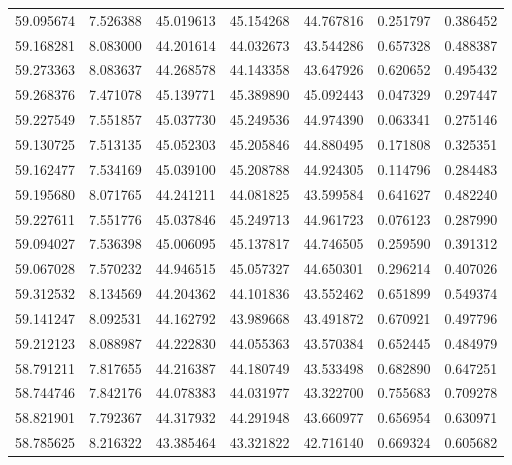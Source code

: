 \begin{tabular}{rrrrrrr}
 59.095674 &   7.526388 &         45.019613 &         45.154268 &         44.767816 &  0.251797 &  0.386452 \\
 59.168281 &   8.083000 &         44.201614 &         44.032673 &         43.544286 &  0.657328 &  0.488387 \\
 59.273363 &   8.083637 &         44.268578 &         44.143358 &         43.647926 &  0.620652 &  0.495432 \\
 59.268376 &   7.471078 &         45.139771 &         45.389890 &         45.092443 &  0.047329 &  0.297447 \\
 59.227549 &   7.551857 &         45.037730 &         45.249536 &         44.974390 &  0.063341 &  0.275146 \\
 59.130725 &   7.513135 &         45.052303 &         45.205846 &         44.880495 &  0.171808 &  0.325351 \\
 59.162477 &   7.534169 &         45.039100 &         45.208788 &         44.924305 &  0.114796 &  0.284483 \\
 59.195680 &   8.071765 &         44.241211 &         44.081825 &         43.599584 &  0.641627 &  0.482240 \\
 59.227611 &   7.551776 &         45.037846 &         45.249713 &         44.961723 &  0.076123 &  0.287990 \\
 59.094027 &   7.536398 &         45.006095 &         45.137817 &         44.746505 &  0.259590 &  0.391312 \\
 59.067028 &   7.570232 &         44.946515 &         45.057327 &         44.650301 &  0.296214 &  0.407026 \\
 59.312532 &   8.134569 &         44.204362 &         44.101836 &         43.552462 &  0.651899 &  0.549374 \\
 59.141247 &   8.092531 &         44.162792 &         43.989668 &         43.491872 &  0.670921 &  0.497796 \\
 59.212123 &   8.088987 &         44.222830 &         44.055363 &         43.570384 &  0.652445 &  0.484979 \\
 58.791211 &   7.817655 &         44.216387 &         44.180749 &         43.533498 &  0.682890 &  0.647251 \\
 58.744746 &   7.842176 &         44.078383 &         44.031977 &         43.322700 &  0.755683 &  0.709278 \\
 58.821901 &   7.792367 &         44.317932 &         44.291948 &         43.660977 &  0.656954 &  0.630971 \\
 58.785625 &   8.216322 &         43.385464 &         43.321822 &         42.716140 &  0.669324 &  0.605682 \\

\end{tabular}
